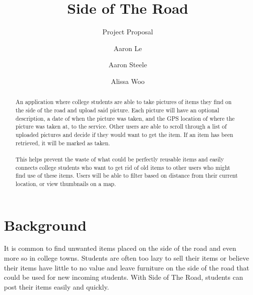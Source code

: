 \documentclass[sigconf]{acmart}
\begin{document}
\title{Side of The Road}
\subtitle{Project Proposal}

\author{Aaron Le}

\author{Aaron Steele}

\author{Alissa Woo}

\renewcommand\footnotetextcopyrightpermission[1]{} %
\pagestyle{plain} %

\begin{abstract}
An application where college students are able to take pictures of items they find on the side of the road and upload said picture. Each picture will have an optional description, a date of when the picture was taken, and the GPS location of where the picture was taken at, to the service. Other users are able to scroll through a list of uploaded pictures and decide if they would want to get the item. If an item has been retrieved, it will be marked as taken. \\\\
This helps prevent the waste of what could be perfectly reusable items and easily connects college students who want to get rid of old items to other users who might find use of these items. Users will be able to filter based on distance from their current location, or view thumbnails on a map.
\end{abstract}

\maketitle

\section{Background}
It is common to find unwanted items placed on the side of the road and even more so in college towns. Students are often too lazy to sell their items or believe their items have little to no value and leave furniture on the side of the road that could be used for new incoming students. With Side of The Road, students can post their items easily and quickly. \\
\end{document}
